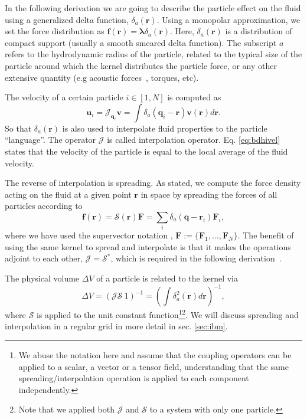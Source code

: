 \documentclass[twoside,openright,titlepage,numbers=noenddot,%
headinclude,footinclude,cleardoublepage=empty,abstract=on,
BCOR=5mm,fontsize=11pt, dvipsnames, paper=b5
]{scrreprt}
\renewcommand{\vec}[1]{\bm{#1}}
\newcommand{\oper}[1]{\mathcal{#1}}
\newcommand{\ppos}{q}
\newcommand{\pvel}{u}
\newcommand{\fpos}{r}
\newcommand{\fvel}{v}
\begin{document}
In the following derivation we are going to describe the particle effect on the fluid using a generalized delta function, $\delta_a(\vec{r})$. Using a monopolar approximation, we set the force distribution as $\vec{f}(\vec{\fpos}) = \vec{\lambda} \delta_a(\vec{\fpos})$. Here, $\delta_a(\vec{\fpos})$ is a distribution of compact support (usually a smooth smeared delta function). The subscript $a$ refers to the hydrodynamic radius of the particle, related to the typical size of the particle around which the kernel distributes the particle force, or any other extensive quantity (e.g acoustic forces~\cite{Balboa2013}, torques, etc).

The velocity of a certain particle $i\in [1,N]$ is computed as
\begin{equation}
  \label{eq:bdhifvel}
  \vec{\pvel}_i= \oper{J}_{\vec{\ppos}_i}\vec{\fvel} =\int{\delta_a(\vec{\ppos}_i - \vec{\fpos})\vec{\fvel}(\vec{\fpos})d\vec{\fpos}}.
\end{equation}
So that $\delta_a(\vec{\fpos})$ is also used  to interpolate fluid properties to the particle ``language''.
The operator $\oper{J}$ is called interpolation operator. Eq. \eqref{eq:bdhivel} states that the velocity of the particle is equal to the local average of the fluid velocity.

The reverse of interpolation is spreading. As stated, we compute the force density acting on the fluid at a given point $\vec{\fpos}$ in space by spreading the forces of all particles according to
\begin{equation}
  \label{eq:spreadoper}
  \vec{f}(\vec{\fpos}) = \oper{S}(\vec{\fpos})\vec{F} = \sum_i\delta_a(\vec{\ppos}-\vec{\fpos}_i)\vec{F}_i,
\end{equation}
where we have used the supervector notation \cite{Dhont1996}, $\vec{F} := \{\vec{F}_1,\dots,\vec{F}_N\}$.
The benefit of using the same kernel to spread and interpolate is that it makes the operations adjoint to each other, $\oper{J} = \oper{S}^*$, which is required in the following derivation~\cite{Delong2014}.

The physical volume $\Delta V$ of a particle is related to the kernel via
\begin{equation}
  \Delta V = (\oper{J}\oper{S}\ 1)^{-1} = \left(\int\delta_a^2(\vec{r})d\vec{r}\right)^{-1},
\end{equation}
where $\oper{S}$ is applied to the unit constant function\footnote{We abuse the notation here and assume that the coupling operators can be applied to a scalar, a vector or a tensor field, understanding that the same spreading/interpolation operation is applied to each component independently.}\footnote{Note that we applied both $\oper{J}$ and $\oper{S}$ to a system with only one particle.}.
We will discuss spreading and interpolation in a regular grid in more detail in sec. \ref{sec:ibm}.
\end{document}
